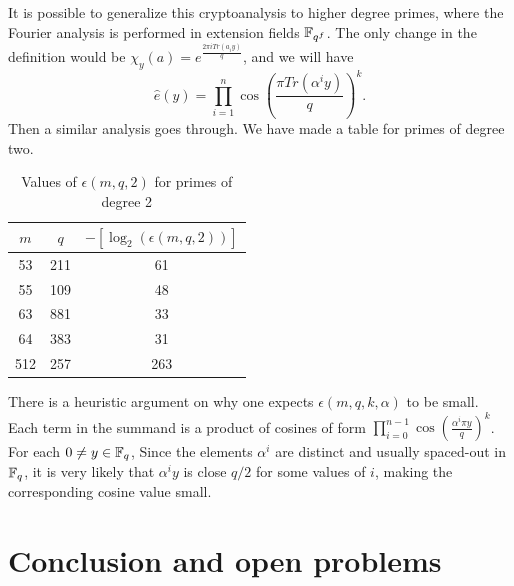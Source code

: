 \documentclass{amsart}
\begin{document}


\begin{remark}
It is possible to generalize this cryptoanalysis to higher degree primes, where the Fourier analysis is performed in extension fields $\mathbb{F}_{q^f}$. The only change in the definition would be $\chi_y(a) = e^{ \frac{2 \pi i Tr(a_i y)}{q}}$, and we will have
\[
    \widehat{e}(y) = \prod_{i=1}^{n} \cos \left(\frac{ \pi Tr(\alpha^i y) }{q} \right)^k.
\]
Then a similar analysis goes through. We have made a table for primes of degree two.
\end{remark}

\FloatBarrier
\begin{table}[H]
\caption{Values of $\epsilon(m,q,2)$ for primes of degree 2}
\begin{tabular}{c|c|c}
$m$ & $q$ & $-[\log_2(\epsilon(m,q,2))]$ \\
\hline
53 & 211 & 61 \\
55 & 109 & 48 \\
63 & 881 & 33 \\
64 & 383 & 31 \\
512 & 257 & 263
\end{tabular}
\end{table}

\begin{remark}
There is a heuristic argument on why one expects $\epsilon(m,q,k,\alpha)$ to be small. Each term in the summand is a product of cosines of form $\prod_{i=0}^{n-1} \cos \left(\frac{ \alpha^i \pi y}{q} \right)^k$. For each $0 \neq y \in \mathbb{F}_q$, Since the elements $\alpha^i$ are distinct and usually spaced-out in $\mathbb{F}_q$, it is very likely that $\alpha^i y$ is close $q/2$ for some values of $i$, making the corresponding cosine value small.
\end{remark}

\section{Conclusion and open problems}



\end{document}
